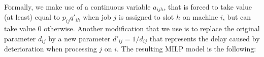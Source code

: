 \documentclass[a4paper,11pt]{article}
\begin{document}
Formally, we make use of a continuous variable $a_{ijh}$, that is forced to take value (at least) equal to $p_{ij} q'_{ih}$ when job $j$ is assigned to slot $h$ on machine $i$, but can take value 0 otherwise. Another modification that we use is to replace the original parameter $d_{ij}$ by a new parameter $d'_{ij} = 1/d_{ij}$ that represents the delay caused by deterioration when processing $j$ on $i$. The resulting MILP model is the following: 
\end{document}
